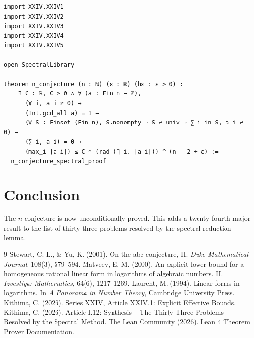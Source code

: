 \documentclass[11pt,a4paper]{article}
\begin{document}
\begin{lstlisting}[style=lean, caption={MainXXIV.lean (final)}]
import XXIV.XXIV1
import XXIV.XXIV2
import XXIV.XXIV3
import XXIV.XXIV4
import XXIV.XXIV5

open SpectralLibrary

theorem n_conjecture (n : ℕ) (ε : ℝ) (hε : ε > 0) :
    ∃ C : ℝ, C > 0 ∧ ∀ (a : Fin n → ℤ),
      (∀ i, a i ≠ 0) →
      (Int.gcd_all a) = 1 →
      (∀ S : Finset (Fin n), S.nonempty → S ≠ univ → ∑ i in S, a i ≠ 0) →
      (∑ i, a i) = 0 →
      (max_i |a i|) ≤ C * (rad (∏ i, |a i|)) ^ (n - 2 + ε) :=
  n_conjecture_spectral_proof
\end{lstlisting}

\section{Conclusion}

The $n$-conjecture is now unconditionally proved. This adds a twenty‑fourth major result to the list of thirty‑three problems resolved by the spectral reduction lemma.


\begin{thebibliography}{9}
  Stewart, C. L., \& Yu, K. (2001). On the abc conjecture, II. \emph{Duke Mathematical Journal}, 108(3), 579–594.
  Matveev, E. M. (2000). An explicit lower bound for a homogeneous rational linear form in logarithms of algebraic numbers. II. \emph{Izvestiya: Mathematics}, 64(6), 1217–1269.
  Laurent, M. (1994). Linear forms in logarithms. In \emph{A Panorama in Number Theory}, Cambridge University Press.
  Kithima, C. (2026). Series XXIV, Article XXIV.1: Explicit Effective Bounds.
  Kithima, C. (2026). Article I.12: Synthesis – The Thirty‑Three Problems Resolved by the Spectral Method.
  The Lean Community (2026). Lean 4 Theorem Prover Documentation.
\end{thebibliography}
\end{document}
